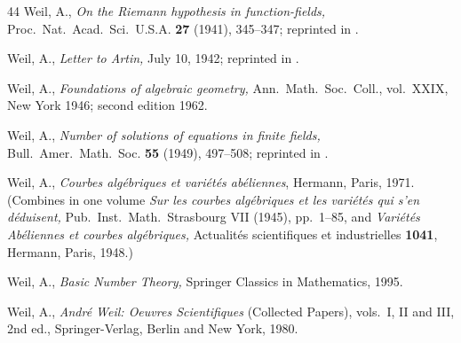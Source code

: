 \documentclass{amsart}
\theoremstyle{definition}\newtheorem{definition}[theorem]{Definition}
\theoremstyle{remark}\newtheorem{remark}[theorem]{Remark}
\numberwithin{equation}{section}
\begin{document}
\begin{thebibliography}{44}
	Weil, A.,
\textit{On the Riemann hypothesis in function-fields,}
{Proc.\ Nat.\ Acad.\ Sci.\ U.S.A.} \textbf{27} (1941), 345--347; reprinted in \cite[vol.~I, pp.~277--279]{aW80}.

	Weil, A.,
\textit{Letter to Artin,} July 10, 1942; reprinted in \cite[vol.~I, pp.~280--298]{aW80}.

	Weil, A.,
\textit{Foundations of algebraic geometry,}
{Ann.\ Math.\ Soc.\ Coll.,} vol.~XXIX, New York 1946; second edition 1962.

	Weil, A.,
\textit{Number of solutions of equations in finite fields,} {Bull.\ Amer.\ Math.\ Soc.} \textbf{55} (1949), 497--508; reprinted in \cite[vol.~I, pp.~399--410]{aW80}.

	Weil, A.,
\textit{Courbes alg\'ebriques et vari\'et\'es ab\'eliennes}, Hermann, Paris, 1971.
(Combines in one volume \textit{Sur les courbes alg\'ebriques et les vari\'et\'es qui s'en d\'e\-dui\-sent,}
Pub.\ Inst.\ Math.\ Strasbourg VII (1945), pp.\ 1--85,
and
{\em Vari\'et\'es Ab\'eliennes et courbes alg\'ebriques,\/}
Actualit\'es scientifiques et industrielles \textbf{1041}, Hermann, Paris, 1948.)

	Weil, A.,
\textit{Basic Number Theory,\/} Springer Classics in Mathematics, 1995.

	Weil, A.,
\textit{Andr\'e Weil: Oeuvres Scientifiques\/} (Collected Papers), vols.\ I, II and III,
2nd ed., Springer-Verlag, Berlin and New York, 1980.

\end{thebibliography}
\end{document}
